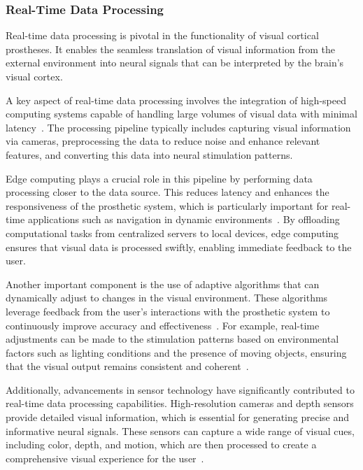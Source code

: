 \documentclass[twocolumn,10pt]{article}
\begin{document}
\subsubsection*{Real-Time Data Processing}
Real-time data processing is pivotal in the functionality of visual cortical
prostheses. It enables the seamless translation of visual information from the
external environment into neural signals that can be interpreted by the brain's
visual cortex.

A key aspect of real-time data processing involves the integration of high-speed
computing systems capable of handling large volumes of visual data with minimal
latency~\parencite{nurmikkoChallengesLargeScaleCortical2020}. The processing
pipeline typically includes capturing visual information via cameras,
preprocessing the data to reduce noise and enhance relevant features, and
converting this data into neural stimulation patterns.

Edge computing plays a crucial role in this pipeline by performing data
processing closer to the data source. This reduces latency and enhances the
responsiveness of the prosthetic system, which is particularly important for
real-time applications such as navigation in dynamic
environments~\parencite{wangDeepLearningEdge2020}. By offloading computational
tasks from centralized servers to local devices, edge computing ensures that
visual data is processed swiftly, enabling immediate feedback to the user.

Another important component is the use of adaptive algorithms that can
dynamically adjust to changes in the visual environment. These algorithms
leverage feedback from the user's interactions with the prosthetic system to
continuously improve accuracy and
effectiveness~\parencite{pio-lopezVisualCorticalProsthesis2021b}. For example,
real-time adjustments can be made to the stimulation patterns based on
environmental factors such as lighting conditions and the presence of moving
objects, ensuring that the visual output remains consistent and
coherent~\parencite{fylstraHumanprosthesisCooperationCombining2022}.

Additionally, advancements in sensor technology have significantly contributed
to real-time data processing capabilities. High-resolution cameras and depth
sensors provide detailed visual information, which is essential for generating
precise and informative neural signals. These sensors can capture a wide range
of visual cues, including color, depth, and motion, which are then processed to
create a comprehensive visual experience for the
user~\parencite{rueckauerExperiencingProstheticVision2022}.
\end{document}
